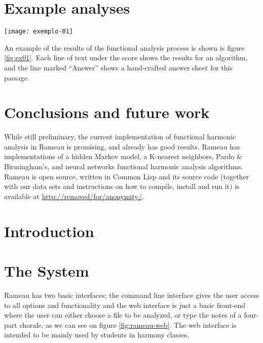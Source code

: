 \section{Example analyses}
\label{sec:example-analyses}

\begin{figure*}[t]
  \centering
  \texttt{[image: exemplo-01]}
  \caption{An excerpt of the analysis of Bach chorale \#20.}
  \label{fig:ex01}
\end{figure*}

An example of the results of the functional analysis process is shown
is figure \ref{fig:ex01}. Each line of text under the score shows the
results for an algorithm, and the line marked ``Answer'' shows a
hand-crafted answer sheet for this passage.

\section{Conclusions and future work}
\label{sec:concl-future-work}

While still preliminary, the current implementation of functional
harmonic analysis in Rameau is promising, and already has good
results. Rameau has implementations of a hidden Markov model, a
K-nearest neighbors, Pardo \& Birmingham's, and neural networks
functional harmonic analysis algorithms. Rameau is open source,
written in Common Lisp and its source code (together with our data
sets and instructions on how to compile, install and run it) is
available at \url{http://removed/for/anonymity/}.

\section{Introduction}


\section{The System}
\label{sec:system}

Rameau has two basic interfaces; the command line interface gives the
user access to all options and functionality and the web interface is
just a basic front-end where the user can either choose a file to be
analyzed, or type the notes of a four-part chorale, as we can see on
figure \ref{fig:rameau-web}. The web interface is intended to be
mainly used by students in harmony classes.


